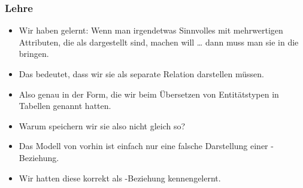 \documentclass[aspectratio=169,mathserif,notheorems]{beamer}%
\begin{document}
%
\begin{frame}%
\frametitle{Lehre}%
\begin{itemize}%
\item Wir haben gelernt: Wenn man irgendetwas Sinnvolles mit mehrwertigen Attributen, die als  dargestellt sind, machen will {\dots} dann muss man sie in die  bringen.%
%
\item<2-> Das bedeutet, dass wir sie als separate Relation darstellen müssen.%
%
\item<3-> Also genau in der Form, die wir beim Übersetzen von Entitätstypen in Tabellen genannt hatten.%
%
\item<4-> Warum speichern wir sie also nicht gleich so?%
%
\item<5-> Das Modell von vorhin ist einfach nur eine falsche Darstellung einer -Beziehung.%
%
\item<6-> Wir hatten diese korrekt als -Beziehung kennengelernt.%
\end{itemize}%
\end{frame}%
%
\end{document}
